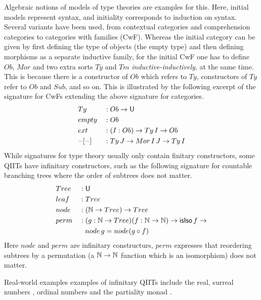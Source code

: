 \documentclass[sigplan,review,anonymous]{acmart}\settopmatter{printfolios=true,printccs=false,printacmref=false}
\begin{document}
Algebraic notions of models of type theories are examples for this. Here,
initial models represent syntax, and initiality corresponds to induction on
syntax. Several variants have been used, from contextual categories \cite{gat}
and comprehension categories \cite{jacobs1993comprehension} to categories with
families \cite{Dybjer96internaltype} (CwF).
%
Whereas the initial category can be given by first defining the type
of objects (the empty type) and then defining morphisms as a separate
inductive family, for the initial CwF one has to define $Ob$, $Mor$
and two extra sorts $Ty$ and $Tm$ \emph{inductive-inductively}, at the
same time. This is because there is a constructor of $Ob$ which refers
to $Ty$, constructors of $Ty$ refer to $Ob$ and $Sub$, and so on. This
is illustrated by the following excerpt of the signature for CwFs
extending the above signature for categories.
\begin{alignat*}{3}
  & Ty && : Ob\rightarrow \mathsf{U} \\
  & empty  && : Ob \\
  & ext && : (I:Ob)\rightarrow Ty\,I\rightarrow Ob \\
  & \mathord{\hspace{1pt}\text{--}\hspace{1pt}}[\mathord{\hspace{1pt}\text{--}\hspace{1pt}}] && : Ty\,J\rightarrow Mor\,I\,J\rightarrow Ty\,I
\end{alignat*}
While signatures for type theory usually only contain finitary constructors,
some QIITs have infinitary constructors, such as the following signature for
countable branching trees where the order of subtrees does not matter.
\begin{alignat*}{3}
  & Tree && : \mathsf{U} \\
  & leaf  && : Tree \\
  & node && : (\mathbb{N}\rightarrow Tree)\rightarrow Tree \\
  & perm && : (g :\mathbb{N}\rightarrow Tree)(f : \mathbb{N}\rightarrow\mathbb{N})\rightarrow \mathsf{isIso}\,f\rightarrow \\
  & && \hspace{0.8em} node\,g = node (g\circ f)
\end{alignat*}
Here $node$ and $perm$ are infinitary constructurs, $perm$ expresses
that reordering subtrees by a permutation (a $\mathbb{N}\rightarrow\mathbb{N}$ function which
is an isomorphism) does not matter.

Real-world examples examples of infinitary QIITs include the real, surreal numbers \cite{HoTTbook}, ordinal numbers \cite{lumsdaineShulman} and the partiality monad \cite{partiality}.
\end{document}
